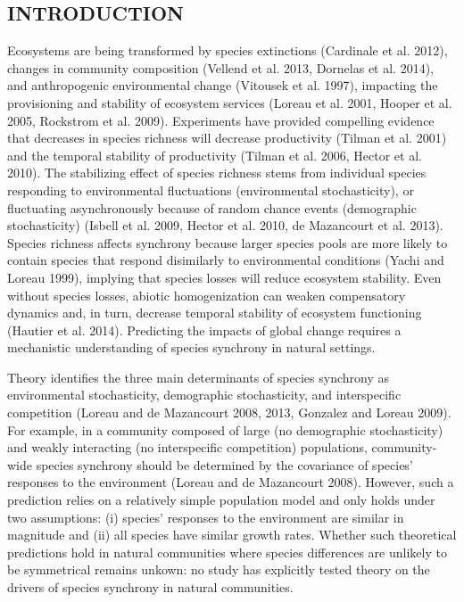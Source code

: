 \documentclass[12pt,]{article}
\begin{document}
\setlength{\parindent}{5ex}

\subsection{INTRODUCTION}\label{introduction}

Ecosystems are being transformed by species extinctions (Cardinale et
al. 2012), changes in community composition (Vellend et al. 2013,
Dornelas et al. 2014), and anthropogenic environmental change (Vitousek
et al. 1997), impacting the provisioning and stability of ecosystem
services (Loreau et al. 2001, Hooper et al. 2005, Rockstrom et al.
2009). Experiments have provided compelling evidence that decreases in
species richness will decrease productivity (Tilman et al. 2001) and the
temporal stability of productivity (Tilman et al. 2006, Hector et al.
2010). The stabilizing effect of species richness stems from individual
species responding to environmental fluctuations (environmental
stochasticity), or fluctuating asynchronously because of random chance
events (demographic stochasticity) (Isbell et al. 2009, Hector et al.
2010, {{de Mazancourt}} et al. 2013). Species richness affects synchrony
because larger species pools are more likely to contain species that
respond disimilarly to environmental conditions (Yachi and Loreau 1999),
implying that species losses will reduce ecosystem stability. Even
without species losses, abiotic homogenization can weaken compensatory
dynamics and, in turn, decrease temporal stability of ecosystem
functioning (Hautier et al. 2014). Predicting the impacts of global
change requires a mechanistic understanding of species synchrony in
natural settings.

Theory identifies the three main determinants of species synchrony as
environmental stochasticity, demographic stochasticity, and
interspecific competition (Loreau and {{de Mazancourt}} 2008, 2013,
Gonzalez and Loreau 2009). For example, in a community composed of large
(no demographic stochasticity) and weakly interacting (no interspecific
competition) populations, community-wide species synchrony should be
determined by the covariance of species' responses to the environment
(Loreau and {{de Mazancourt}} 2008). However, such a prediction relies
on a relatively simple population model and only holds under two
assumptions: (i) species' responses to the environment are similar in
magnitude and (ii) all species have similar growth rates. Whether such
theoretical predictions hold in natural communities where species
differences are unlikely to be symmetrical remains unkown: no study has
explicitly tested theory on the drivers of species synchrony in natural
communities.
\end{document}
